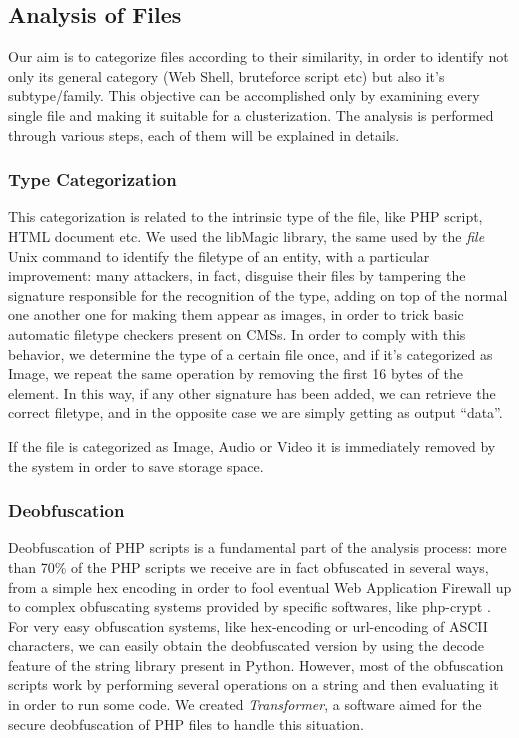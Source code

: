 \subsection{Analysis of Files}

Our aim is to categorize files according to their similarity, in order to identify not only its general category (Web Shell, bruteforce script etc) but also it's subtype/family. This objective can be accomplished only by examining every single file and making it suitable for a clusterization.
The analysis is performed through various steps, each of them will be explained in details.

\subsubsection{Type Categorization}
This categorization is related to the intrinsic type of the file, like PHP script, HTML document etc.
We used the libMagic \cite{libmagic} library, the same used by the \emph{file} Unix command to identify the filetype of an entity, with a particular improvement: many attackers, in fact, disguise their files by tampering the signature responsible for the recognition of the type, adding on top of the normal one another one for making them appear as images, in order to trick basic automatic filetype checkers present on CMSs. In order to comply with this behavior, we determine the type of a certain file once, and if it's categorized as Image, we repeat the same operation by removing the first 16 bytes of the element. In this way, if any other signature has been added, we can retrieve the correct filetype, and in the opposite case we are simply getting as output ``data''.

If the file is categorized as Image, Audio or Video it is immediately removed by the system in order to save storage space.

\subsubsection{Deobfuscation}
Deobfuscation of PHP scripts is a fundamental part of the analysis process: more than 70\% of the PHP scripts we receive are in fact obfuscated in several ways, from a simple hex encoding in order to fool eventual Web Application Firewall up to complex obfuscating systems provided by specific softwares, like php-crypt \cite{phpcrypt}.
For very easy obfuscation systems, like hex-encoding or url-encoding of ASCII characters, we can easily obtain the deobfuscated version by using the decode feature of the string library present in Python.
However, most of the obfuscation scripts work by performing several operations on a string and then evaluating it in order to run some code. We created \emph{Transformer}, a software aimed for the secure deobfuscation of PHP files to handle this situation.

